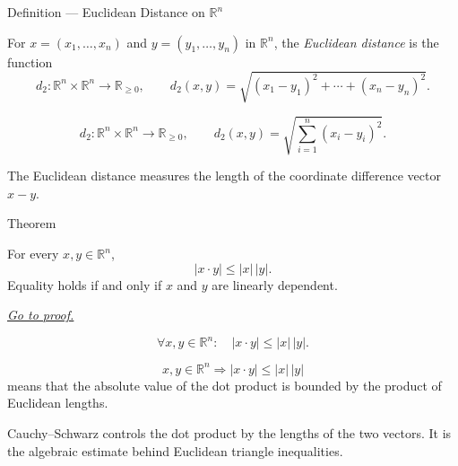 \DefinitionalRoot

\begin{definitionbox}{Definition --- Euclidean Distance on \(\mathbb{R}^n\)}
\begin{definition}
\label{def:euclidean-distance-rn}
For \(x=(x_1,\ldots,x_n)\) and \(y=(y_1,\ldots,y_n)\) in \(\mathbb{R}^n\),
the \emph{Euclidean distance} is the function
\[
  d_2:\mathbb{R}^n\times\mathbb{R}^n\to\mathbb{R}_{\geq 0},
  \qquad
  d_2(x,y)
  =
  \sqrt{(x_1-y_1)^2+\cdots+(x_n-y_n)^2}.
\]
\end{definition}
\end{definitionbox}

\begin{remark*}
\[
d_2:\mathbb{R}^n\times\mathbb{R}^n\to\mathbb{R}_{\geq 0},
\qquad
d_2(x,y)=\sqrt{\sum_{i=1}^n (x_i-y_i)^2}.
\]
\end{remark*}

\begin{remark*}[Interpretation]
The Euclidean distance measures the length of the coordinate difference vector
\(x-y\).
\end{remark*}

\DefinitionalRoot

\begin{theorembox}{Theorem}
\begin{theorem}
\label{thm:cauchy-schwarz-inequality}
For every \(x,y\in\mathbb{R}^n\),
\[
  |x\cdot y|\leq |x|\,|y|.
\]
Equality holds if and only if \(x\) and \(y\) are linearly dependent.

\smallskip
\noindent
\hyperref[prf:cauchy-schwarz-inequality]{\textit{Go to proof.}}
\end{theorem}
\end{theorembox}

\begin{remark*}
\[
\forall x,y\in\mathbb{R}^n{:}\quad |x\cdot y|\leq |x|\,|y|.
\]
\end{remark*}

\begin{remark*}
\[
x,y\in\mathbb{R}^n
\Longrightarrow
|x\cdot y|\leq |x|\,|y|
\]
means that the absolute value of the dot product is bounded by the product of
Euclidean lengths.
\end{remark*}

\begin{remark*}[Interpretation]
Cauchy--Schwarz controls the dot product by the lengths of the two vectors.
It is the algebraic estimate behind Euclidean triangle inequalities.
\end{remark*}

